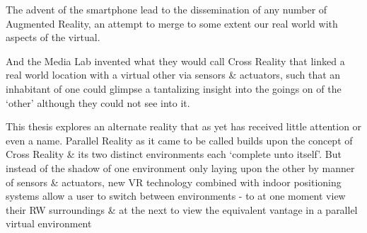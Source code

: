 The advent of the smartphone lead to the dissemination of any number of Augmented Reality, an attempt to merge to some extent our real world with aspects of the virtual.


And the Media Lab invented what they would call Cross Reality that linked a real world location with a virtual other via sensors \& actuators, such that an inhabitant of one could glimpse a tantalizing insight into the goings on of the `other' although they could not see into it.

This thesis explores an alternate reality that as yet has received little attention or even a name. Parallel Reality as it came to be called builds upon the concept of Cross Reality \& its two distinct environments each `complete unto itself'. But instead of the shadow of one environment only laying upon the other by manner of sensors \& actuators, new VR technology combined with indoor positioning systems allow a user to switch between environments - to at one moment view their RW surroundings \& at the next to view the equivalent vantage in a parallel virtual environment
